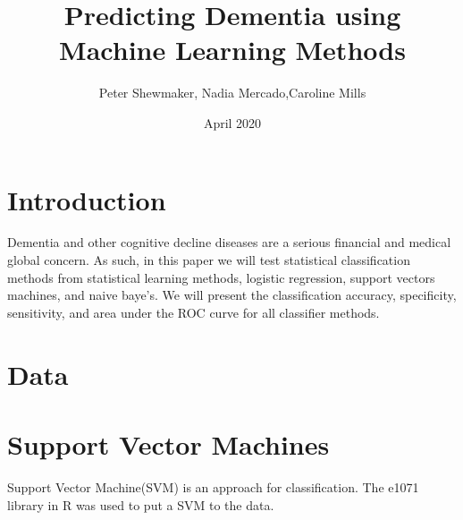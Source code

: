\documentclass[a4paper,man,natbib,11pt]{article}
\title{Predicting Dementia using Machine Learning Methods}
\author{Peter Shewmaker, Nadia Mercado,Caroline Mills  }
\date{April 2020}
\begin{document}
\maketitle

\section{Introduction}

Dementia and other cognitive decline diseases are a serious financial and medical global concern. As such, in this paper we will test statistical classification methods from statistical learning methods, logistic regression, support vectors machines, and naive baye's. We will present the classification accuracy, specificity, sensitivity, and area under the ROC curve for all classifier methods. 

\section{Data}

\section{Support Vector Machines}

Support Vector Machine(SVM) is an approach for classification. The e1071 library in R was used to put a SVM to the data. 
\end{document}
